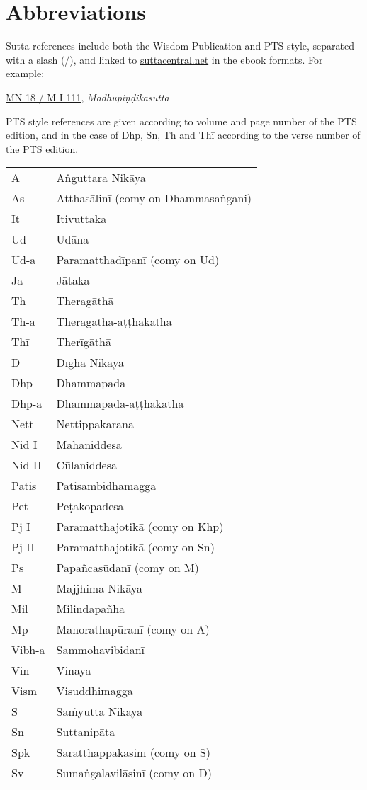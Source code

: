 \chapter{Abbreviations}

{\fontsize{9.5}{13}\selectfont

Sutta references include both the Wisdom Publication and PTS style, separated with a slash (/), and linked to \href{https://suttacentral.net}{suttacentral.net} in the ebook formats. For example:

\href{https://suttacentral.net/mn18/pli/ms}{MN 18 / M I 111}, \emph{Madhupiṇḍikasutta}

PTS style references are given according to volume and page number of the PTS edition, and in the case of Dhp, Sn, Th and Thī according to the verse number of the PTS edition.

\bigskip

\hspace*{\quoteMargin}%
\begin{tabular}{@{}ll@{}}
A & Aṅguttara Nikāya \\
As & Atthasālinī (comy on Dhammasaṅgani) \\
It & Itivuttaka \\
Ud & Udāna \\
Ud-a & Paramatthadīpanī (comy on Ud) \\
Ja & Jātaka \\
Th & Theragāthā \\
Th-a & Theragāthā-aṭṭhakathā \\
Thī & Therīgāthā \\
D & Dīgha Nikāya \\
Dhp & Dhammapada \\
Dhp-a & Dhammapada-aṭṭhakathā \\
Nett & Nettippakarana \\
Nid I & Mahāniddesa \\
Nid II & Cūlaniddesa \\
Patis & Patisambidhāmagga \\
Pet & Peṭakopadesa \\
Pj I & Paramatthajotikā (comy on Khp) \\
Pj II & Paramatthajotikā (comy on Sn) \\
Ps & Papañcasūdanī (comy on M) \\
M & Majjhima Nikāya \\
Mil & Milindapañha \\
Mp & Manorathapūranī (comy on A) \\
Vibh-a & Sammohavibidanī \\
Vin & Vinaya \\
Vism & Visuddhimagga \\
S & Saṁyutta Nikāya \\
Sn & Suttanipāta \\
Spk & Sāratthappakāsinī (comy on S) \\
Sv & Sumaṅgalavilāsinī (comy on D) \\
\end{tabular}

}
